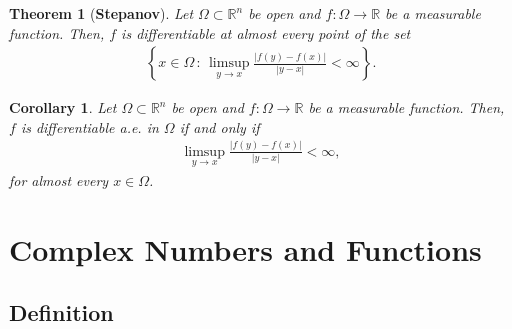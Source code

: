 \documentclass[11pt]{book}
\newtheorem{theorem}{Theorem}[chapter]
\newtheorem{corollary}{Corollary}[theorem]
\theoremstyle{definition}
\numberwithin{equation}{chapter}
\begin{document}
\medskip

\begin{theorem}[{\bf Stepanov}]
Let $\Omega \subset \mathbb{R}^n$ be open and $f: \Omega \to \mathbb{R}$ be a measurable function. Then, $f$ is differentiable at almost every point of the set
\begin{align*}
    \left\{x \in \Omega \,:\, \limsup_{y\to x} \frac{\left|f(y) - f(x)\right|}{\left|y - x\right|} < \infty\right\}.
\end{align*}
\end{theorem}

\medskip

\begin{corollary}
Let $\Omega \subset \mathbb{R}^n$ be open and $f: \Omega \to \mathbb{R}$ be a measurable function. Then, $f$ is differentiable a.e. in $\Omega$ if and only if
\begin{align*}
    \limsup_{y\to x} \frac{\left|f(y) - f(x)\right|}{\left|y - x\right|} < \infty,
\end{align*}
for almost every $x \in \Omega$.
\end{corollary}



\chapter{Complex Numbers and Functions}

\section{Definition}
\end{document}
